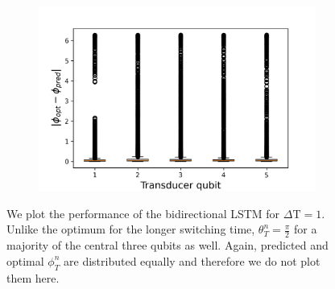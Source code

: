 \begin{figure}[h]
\begin{subfigure}{0.45\textwidth}
	\end{subfigure}
	\begin{subfigure}{0.45\textwidth}
		\centering
		\includegraphics[width=\textwidth]{img/delta_phi_box_dt_12}
	\end{subfigure}
	\caption{We plot the performance of the bidirectional LSTM for $\Delta \mathrm{T} = 1$. Unlike the optimum for the longer switching time, $\theta_T^n = \frac{\pi}{2}$ for a majority of the central three qubits as well. Again, predicted and optimal $\phi^n_T$ are distributed equally and therefore we do not plot them here.}
	\label{dt1box}
\end{figure}

\newpage